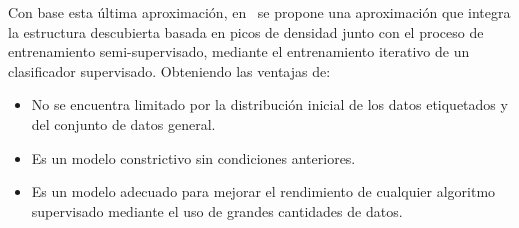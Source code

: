 Con base esta última aproximación, en~\cite{wu2018self} se propone una aproximación que integra la estructura descubierta basada en picos de densidad junto con el proceso de entrenamiento semi-supervisado, mediante el entrenamiento iterativo de un clasificador supervisado. Obteniendo las ventajas de:
\begin{itemize}
\item No se encuentra limitado por la distribución inicial de los datos etiquetados y del conjunto de datos general.
\item Es un modelo constrictivo sin condiciones anteriores.
\item Es un modelo adecuado para mejorar el rendimiento de cualquier algoritmo supervisado mediante el uso de grandes cantidades de datos.
\end{itemize}